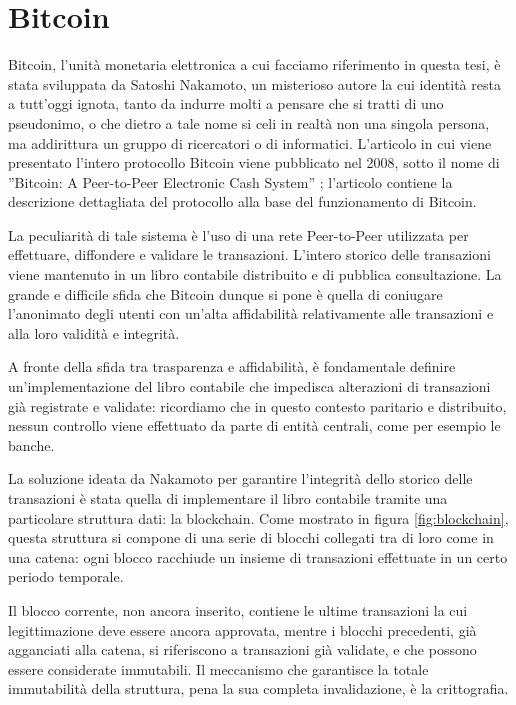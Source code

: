 \section{Bitcoin}
Bitcoin, l’unità monetaria elettronica a cui facciamo riferimento in questa tesi, è stata sviluppata da Satoshi Nakamoto, un misterioso autore la cui identità resta a tutt'oggi ignota, tanto da indurre molti a pensare che si tratti di uno pseudonimo, o che dietro a tale nome si celi in realtà non una singola persona, ma addirittura un gruppo di ricercatori o di informatici. L’articolo in cui viene presentato l’intero protocollo Bitcoin viene pubblicato nel 2008, sotto il nome di ”Bitcoin: A Peer-to-Peer Electronic Cash System” \cite{nakamoto2008bitcoin}; l'articolo contiene la descrizione dettagliata del protocollo alla base del funzionamento di Bitcoin.

La peculiarità di tale sistema è l’uso di una rete Peer-to-Peer utilizzata per effettuare, diffondere e validare le transazioni. L’intero storico delle transazioni viene mantenuto in un libro contabile distribuito e di pubblica consultazione. La grande e difficile sfida che Bitcoin dunque si pone è quella di coniugare l’anonimato degli utenti con un’alta affidabilità relativamente alle transazioni e alla loro validità e integrità.

A fronte della sfida tra trasparenza e affidabilità, è fondamentale definire un’implementazione del libro contabile che impedisca alterazioni di transazioni già registrate e validate: ricordiamo che in questo contesto paritario e distribuito, nessun controllo viene effettuato da parte di entità centrali, come per esempio le banche.


La soluzione ideata da Nakamoto per garantire l’integrità dello storico delle transazioni è stata quella di implementare il libro contabile tramite una particolare struttura dati: la blockchain. Come mostrato in figura \ref{fig:blockchain}, questa struttura si compone di una serie di blocchi collegati tra di loro come in una catena: ogni blocco racchiude un insieme di transazioni effettuate in un certo periodo temporale.

Il blocco corrente, non ancora inserito, contiene le ultime transazioni la cui legittimazione deve essere ancora approvata, mentre i blocchi precedenti, già agganciati alla catena, si riferiscono a transazioni già validate, e che possono essere considerate immutabili. Il meccanismo che garantisce la totale immutabilità della struttura, pena la sua completa invalidazione, è la crittografia.

